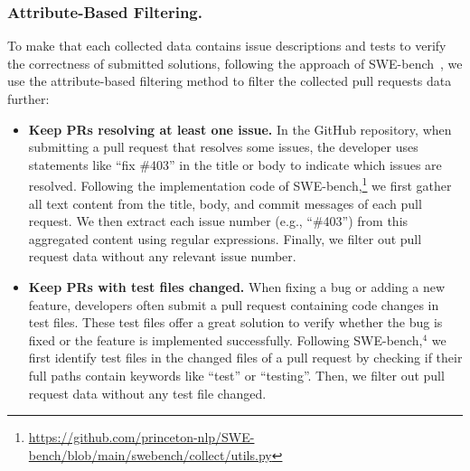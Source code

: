 


\subsubsection{Attribute-Based Filtering.}
To make that each collected data contains issue descriptions and tests to verify the correctness of submitted solutions, following the approach of SWE-bench~\cite{jimenez2023swe}, we use the attribute-based filtering method to filter the collected pull requests data further:

\begin{itemize}[left=10pt]
    \item \textbf{Keep PRs resolving at least one issue.} In the GitHub repository, when submitting a pull request that resolves some issues, the developer uses statements like ``fix \#403'' in the title or body to indicate which issues are resolved. Following the implementation code of SWE-bench,\footnote{\url{https://github.com/princeton-nlp/SWE-bench/blob/main/swebench/collect/utils.py}} we first gather all text content from the title, body, and commit messages of each pull request. We then extract each issue number (e.g., ``\#403'') from this aggregated content using regular expressions. Finally, we filter out pull request data without any relevant issue number.
    \item \textbf{Keep PRs with test files changed.}
When fixing a bug or adding a new feature, developers often submit a pull request containing code changes in test files. These test files offer a great solution to verify whether the bug is fixed or the feature is implemented successfully. Following SWE-bench,$^4$ we first identify test files in the changed files of a pull request by checking if their full paths contain keywords like ``test'' or ``testing''. Then, we filter out pull request data without any test file changed.
\end{itemize}

